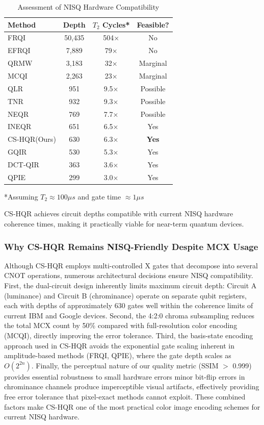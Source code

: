 \documentclass[11pt,a4paper]{article}
\begin{document}
\begin{table}[H]
\centering
\caption{Assessment of NISQ Hardware Compatibility}
\label{tab:nisq_feasibility}
\begin{tabular}{@{}lccc@{}}
\toprule
\textbf{Method} & \textbf{Depth} & \textbf{$T_2$ Cycles*} & \textbf{Feasible?} \\
\midrule
FRQI & 50,435 & 504× & No \\
EFRQI & 7,889 & 79× & No \\
QRMW & 3,183 & 32× & Marginal \\
MCQI & 2,263 & 23× & Marginal \\
QLR & 951 & 9.5× & Possible \\
TNR & 932 & 9.3× & Possible \\
NEQR & 769 & 7.7× & Possible \\
INEQR & 651 & 6.5× & Yes \\
\rowcolor{green!15}
CS-HQR(Ours) & 630 & 6.3× & \textbf{Yes} \\
GQIR & 530 & 5.3× & Yes \\
DCT-QIR & 363 & 3.6× & Yes \\
QPIE & 299 & 3.0× & Yes \\
\bottomrule
\end{tabular}

\footnotesize{*Assuming $T_2 \approx 100\mu s$ and gate time $\approx 1\mu s$}
\end{table}

CS-HQR achieves circuit depths compatible with current NISQ hardware coherence times, making it practically viable for near-term quantum devices.

\subsubsection{Why CS-HQR Remains NISQ-Friendly Despite MCX Usage}

Although CS-HQR employs multi-controlled X gates that decompose into several CNOT operations, numerous architectural decisions ensure NISQ compatibility. First, the dual-circuit design inherently limits maximum circuit depth: Circuit A (luminance) and Circuit B (chrominance) operate on separate qubit registers, each with depths of approximately 630 gates well within the coherence limits of current IBM and Google devices. Second, the 4:2:0 chroma subsampling reduces the total MCX count by 50\% compared with full-resolution color encoding (MCQI), directly improving the error tolerance. Third, the basis-state encoding approach used in CS-HQR avoids the exponential gate scaling inherent in amplitude-based methods (FRQI, QPIE), where the gate depth scales as $O(2^{2n})$. Finally, the perceptual nature of our quality metric (SSIM $>$ 0.999) provides essential robustness to small hardware errors minor bit-flip errors in chrominance channels produce imperceptible visual artifacts, effectively providing  free  error tolerance that pixel-exact methods cannot exploit. These combined factors make CS-HQR one of the most practical color image encoding schemes for current NISQ hardware.
\end{document}
